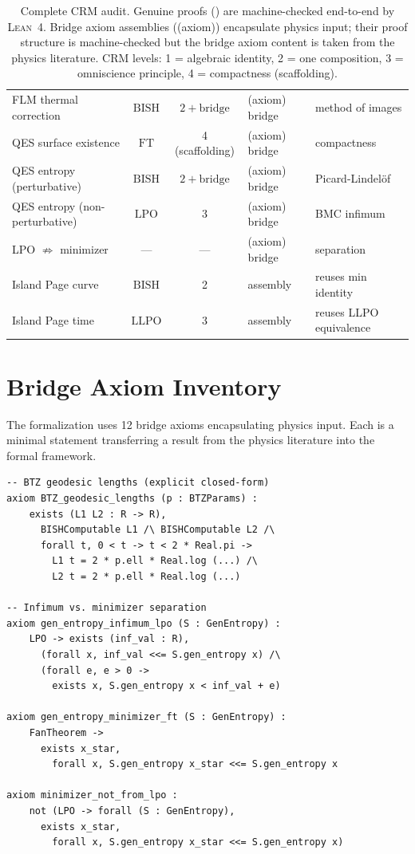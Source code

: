 \documentclass[11pt,a4paper]{article}
\theoremstyle{plain}
\theoremstyle{definition}
\newcommand{\LPO}{\ensuremath{\mathrm{LPO}}}
\newcommand{\LLPO}{\ensuremath{\mathrm{LLPO}}}
\newcommand{\BISH}{\ensuremath{\mathrm{BISH}}}
\newcommand{\FT}{\ensuremath{\mathrm{FT}}}
\newcommand{\Lean}{\textsc{Lean~4}}
\newcommand{\leanok}{\textsf{\small \textcolor{green!70!black}{\checkmark}}}
\newcommand{\leanaxiom}{\textsf{\small \textcolor{orange!80!black}{(axiom)}}}
\begin{document}
\begin{table}[ht]
\begin{tabular}{@{}lccll@{}}
FLM thermal correction & $\BISH$ & $2 + \text{bridge}$ & \leanaxiom{} bridge & method of images \\
QES surface existence & $\FT$ & 4 (scaffolding) & \leanaxiom{} bridge & compactness \\
QES entropy (perturbative) & $\BISH$ & $2 + \text{bridge}$ & \leanaxiom{} bridge & Picard-Lindel\"of \\
QES entropy (non-perturbative) & $\LPO$ & 3 & \leanaxiom{} bridge & BMC infimum \\
LPO $\not\Rightarrow$ minimizer & --- & --- & \leanaxiom{} bridge & separation \\
Island Page curve & $\BISH$ & 2 & \leanok{} assembly & reuses min identity \\
Island Page time & $\LLPO$ & 3 & \leanok{} assembly & reuses LLPO equivalence \\
\bottomrule
\end{tabular}
\caption{Complete CRM audit.  Genuine proofs (\leanok) are machine-checked
end-to-end by \Lean{}.  Bridge axiom assemblies (\leanaxiom) encapsulate
physics input; their proof structure is machine-checked but the bridge
axiom content is taken from the physics literature.
CRM levels: 1 = algebraic identity, 2 = one composition,
3 = omniscience principle, 4 = compactness (scaffolding).}
\label{tab:audit}
\end{table}

\section{Bridge Axiom Inventory}\label{sec:bridges}

The formalization uses 12 bridge axioms encapsulating physics input.
Each is a minimal statement transferring a result from the physics
literature into the formal framework.

\begin{lstlisting}[caption={Representative bridge axioms: \texttt{Defs.lean}}]
-- BTZ geodesic lengths (explicit closed-form)
axiom BTZ_geodesic_lengths (p : BTZParams) :
    exists (L1 L2 : R -> R),
      BISHComputable L1 /\ BISHComputable L2 /\
      forall t, 0 < t -> t < 2 * Real.pi ->
        L1 t = 2 * p.ell * Real.log (...) /\
        L2 t = 2 * p.ell * Real.log (...)

-- Infimum vs. minimizer separation
axiom gen_entropy_infimum_lpo (S : GenEntropy) :
    LPO -> exists (inf_val : R),
      (forall x, inf_val <<= S.gen_entropy x) /\
      (forall e, e > 0 ->
        exists x, S.gen_entropy x < inf_val + e)

axiom gen_entropy_minimizer_ft (S : GenEntropy) :
    FanTheorem ->
      exists x_star,
        forall x, S.gen_entropy x_star <<= S.gen_entropy x

axiom minimizer_not_from_lpo :
    not (LPO -> forall (S : GenEntropy),
      exists x_star,
        forall x, S.gen_entropy x_star <<= S.gen_entropy x)
\end{lstlisting}
\end{document}

